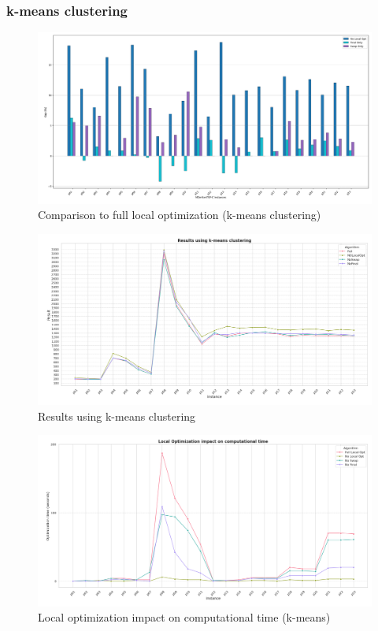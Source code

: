 \documentclass{article}
\begin{document}
	\subsubsection{k-means clustering}
	\;
	\begin{figure}[hb!]
		\caption{Comparison to full local optimization (k-means clustering)}
		\centering
		\includegraphics[width=\textwidth]{local_opt_comp_to_full_kmeans}
	\end{figure}
	\begin{figure}[hb!]
		\caption{Results using k-means clustering}
		\centering
		\includegraphics[width=\textwidth]{Results_kmeans}
	\end{figure}
	\begin{figure}[hb!]
		\caption{Local optimization impact on computational time (k-means)}
		\centering
		\includegraphics[width=\textwidth]{optimization_times_kmeans}
	\end{figure}
\end{document}
